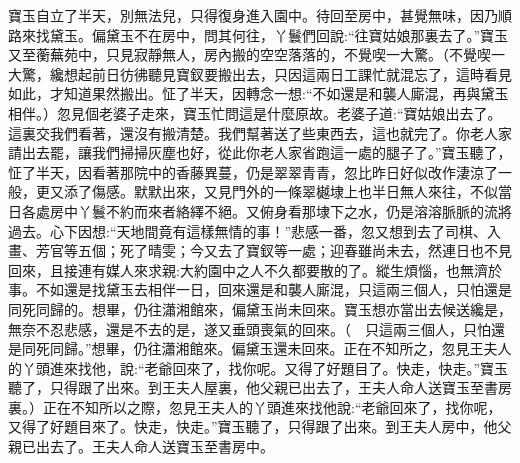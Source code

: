 \begin{parag}
    寶玉自立了半天，別無法兒，只得復身進入園中。待回至房中，甚覺無味，因乃順路來找黛玉。偏黛玉不在房中，問其何往，丫鬟們回說:“往寶姑娘那裏去了。”寶玉又至蘅蕪苑中，只見寂靜無人，房內搬的空空落落的，不覺喫一大驚。（不覺喫一大驚，纔想起前日彷彿聽見寶釵要搬出去，只因這兩日工課忙就混忘了，這時看見如此，才知道果然搬出。怔了半天，因轉念一想:“不如還是和襲人廝混，再與黛玉相伴。）忽見個老婆子走來，寶玉忙問這是什麼原故。老婆子道:“寶姑娘出去了。這裏交我們看著，還沒有搬清楚。我們幫著送了些東西去，這也就完了。你老人家請出去罷，讓我們掃掃灰塵也好，從此你老人家省跑這一處的腿子了。”寶玉聽了，怔了半天，因看著那院中的香藤異蔓，仍是翠翠青青，忽比昨日好似改作淒涼了一般，更又添了傷感。默默出來，又見門外的一條翠樾埭上也半日無人來往，不似當日各處房中丫鬟不約而來者絡繹不絕。又俯身看那埭下之水，仍是溶溶脈脈的流將過去。心下因想:“天地間竟有這樣無情的事！”悲感一番，忽又想到去了司棋、入畫、芳官等五個；死了晴雯；今又去了寶釵等一處；迎春雖尚未去，然連日也不見回來，且接連有媒人來求親:大約園中之人不久都要散的了。縱生煩惱，也無濟於事。不如還是找黛玉去相伴一日，回來還是和襲人廝混，只這兩三個人，只怕還是同死同歸的。想畢，仍往瀟湘館來，偏黛玉尚未回來。寶玉想亦當出去候送纔是，無奈不忍悲感，還是不去的是，遂又垂頭喪氣的回來。（　只這兩三個人，只怕還是同死同歸。”想畢，仍往瀟湘館來。偏黛玉還未回來。正在不知所之，忽見王夫人的丫頭進來找他，說:“老爺回來了，找你呢。又得了好題目了。快走，快走。”寶玉聽了，只得跟了出來。到王夫人屋裏，他父親已出去了，王夫人命人送寶玉至書房裏。）正在不知所以之際，忽見王夫人的丫頭進來找他說:“老爺回來了，找你呢，又得了好題目來了。快走，快走。”寶玉聽了，只得跟了出來。到王夫人房中，他父親已出去了。王夫人命人送寶玉至書房中。
\end{parag}


